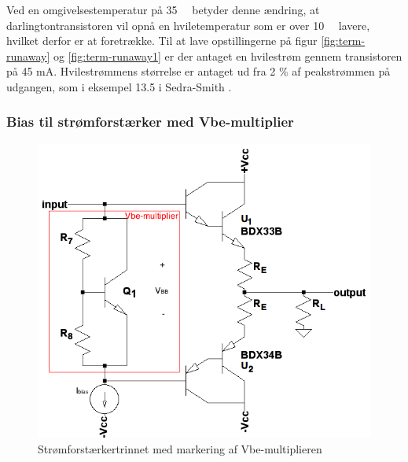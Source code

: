 Ved en omgivelsestemperatur på 35~\celsius~ betyder denne ændring, at darlingtontransistoren vil opnå en hviletemperatur som er over 10~\celsius~ lavere, hvilket derfor er at foretrække. Til at lave opstillingerne på figur \ref{fig:term-runaway} og \ref{fig:term-runaway1} er der antaget en hvilestrøm gennem transistoren på 45 mA. Hvilestrømmens størrelse er antaget ud fra 2 \% af peakstrømmen på udgangen, som i eksempel 13.5 i Sedra-Smith .


\subsubsection*{Bias til strømforstærker med Vbe-multiplier}

\begin{figure}[h]
\centering
\includegraphics[scale=.4]{teknisk/effektforstaerker/vbemultiplieropbygning.png}
\caption{Strømforstærkertrinnet med markering af Vbe-multiplieren}
\label{fig:vbemulti}
\end{figure}


